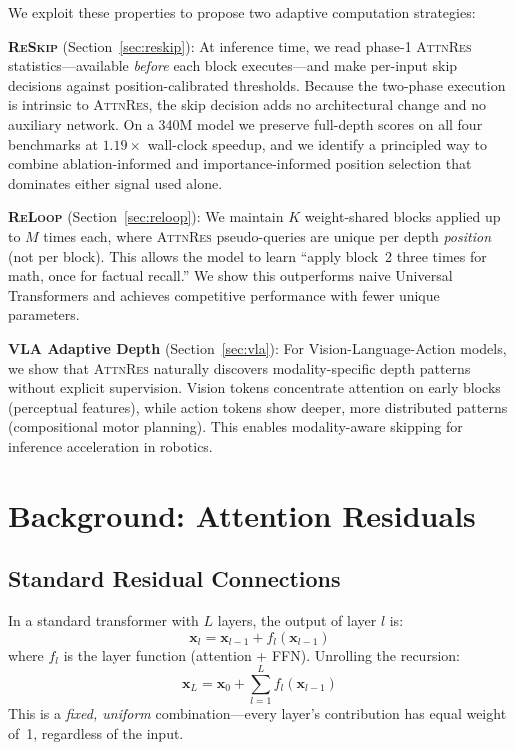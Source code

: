 \documentclass{article}
\newcommand{\attnres}{\textsc{AttnRes}}
\newcommand{\reskip}{\textsc{ReSkip}}
\newcommand{\reloop}{\textsc{ReLoop}}
\begin{document}
We exploit these properties to propose two adaptive computation strategies:

\textbf{\reskip{}} (Section~\ref{sec:reskip}): At inference time, we read phase-1 \attnres{} statistics---available \emph{before} each block executes---and make per-input skip decisions against position-calibrated thresholds. Because the two-phase execution is intrinsic to \attnres{}, the skip decision adds no architectural change and no auxiliary network. On a 340M model we preserve full-depth scores on all four benchmarks at $1.19\times$ wall-clock speedup, and we identify a principled way to combine ablation-informed and importance-informed position selection that dominates either signal used alone.

\textbf{\reloop{}} (Section~\ref{sec:reloop}): We maintain $K$ weight-shared blocks applied up to $M$ times each, where \attnres{} pseudo-queries are unique per depth \emph{position} (not per block). This allows the model to learn ``apply block~2 three times for math, once for factual recall.'' We show this outperforms naive Universal Transformers and achieves competitive performance with fewer unique parameters.

\textbf{VLA Adaptive Depth} (Section~\ref{sec:vla}): For Vision-Language-Action models, we show that \attnres{} naturally discovers modality-specific depth patterns without explicit supervision. Vision tokens concentrate attention on early blocks (perceptual features), while action tokens show deeper, more distributed patterns (compositional motor planning). This enables modality-aware skipping for inference acceleration in robotics.

\section{Background: Attention Residuals}
\label{sec:background}

\subsection{Standard Residual Connections}

In a standard transformer with $L$ layers, the output of layer $l$ is:
\begin{equation}
    \mathbf{x}_l = \mathbf{x}_{l-1} + f_l(\mathbf{x}_{l-1})
\end{equation}
where $f_l$ is the layer function (attention + FFN). Unrolling the recursion:
\begin{equation}
    \mathbf{x}_L = \mathbf{x}_0 + \sum_{l=1}^{L} f_l(\mathbf{x}_{l-1})
\end{equation}
This is a \emph{fixed, uniform} combination---every layer's contribution has equal weight of~1, regardless of the input.
\end{document}

